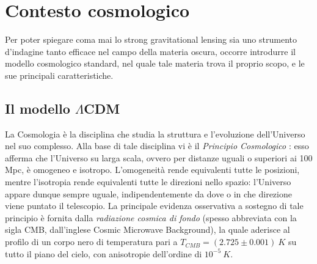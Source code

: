 \chapter{Contesto cosmologico}
\label{cap:cosmologia}
Per poter spiegare coma mai lo strong gravitational lensing sia uno strumento d'indagine tanto efficace nel campo della materia oscura, occorre introdurre il modello cosmologico standard, nel quale tale materia trova il proprio scopo, e le sue principali caratteristiche.
\section{Il modello \texorpdfstring{$\Lambda$CDM}{LambdaCDM}}
La Cosmologia è la disciplina che studia la struttura e l'evoluzione dell'Universo nel suo complesso.
Alla base di tale disciplina vi è il \emph{Principio Cosmologico} \parencite{Ryden2003}: esso afferma che l'Universo su larga scala, ovvero per distanze uguali o superiori ai 100 Mpc, è omogeneo e isotropo.
L'omogeneità rende equivalenti tutte le posizioni, mentre l'isotropia rende equivalenti tutte le direzioni nello spazio: l'Universo appare dunque sempre uguale, indipendentemente da dove o in che direzione viene puntato il telescopio.
La principale evidenza osservativa a sostegno di tale principio è fornita dalla \emph{radiazione cosmica di fondo} (spesso abbreviata con la sigla CMB, dall'inglese Cosmic Microwave Background), la quale aderisce al profilo di un corpo nero di temperatura pari a $T_{CMB}=(2.725 \pm 0.001)\ K$ su tutto il piano del cielo, con anisotropie dell'ordine di $10^{-5}\ K$.

